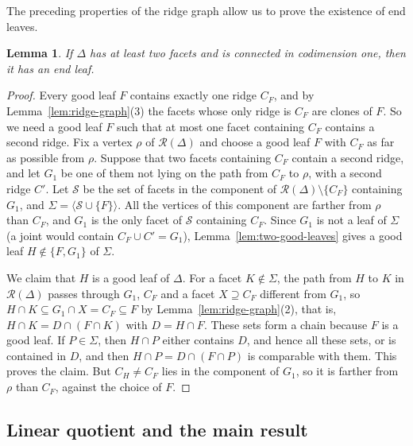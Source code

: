 \documentclass{amsart}
\newtheorem{Lemma}[Theorem]{Lemma}
\theoremstyle{definition}
\theoremstyle{remark}
\begin{document}


The preceding properties of the ridge graph allow us to prove the existence of end leaves.
\begin{Lemma}\label{lem:end-leaf}
If $\Delta$ has at least two facets and is connected in codimension one, then it has an end leaf.
\end{Lemma}
\begin{proof}
Every good leaf $F$ contains exactly one ridge $C_F$, and by Lemma~\ref{lem:ridge-graph}(3) the facets whose only ridge is $C_F$ are clones of $F$. So we need a good leaf $F$ such that at most one facet containing $C_F$ contains a second ridge. Fix a vertex $\rho$ of $\mathcal R(\Delta)$ and choose a good leaf $F$ with $C_F$ as far as possible from $\rho$. Suppose that two facets containing $C_F$ contain a second ridge, and let $G_1$ be one of them not lying on the path from $C_F$ to $\rho$, with a second ridge $C'$. Let $\mathcal S$ be the set of facets in the component of $\mathcal R(\Delta)\setminus\{C_F\}$ containing $G_1$, and $\Sigma=\langle\mathcal S\cup\{F\}\rangle$. All the vertices of this component are farther from $\rho$ than $C_F$, and $G_1$ is the only facet of $\mathcal S$ containing $C_F$. Since $G_1$ is not a leaf of $\Sigma$ (a joint would contain $C_F\cup C'=G_1$), Lemma~\ref{lem:two-good-leaves} gives a good leaf $H\notin\{F,G_1\}$ of $\Sigma$.

We claim that $H$ is a good leaf of $\Delta$. For a facet $K\notin\Sigma$, the path from $H$ to $K$ in $\mathcal R(\Delta)$ passes through $G_1$, $C_F$ and a facet $X\supseteq C_F$ different from $G_1$, so $H\cap K\subseteq G_1\cap X=C_F\subseteq F$ by Lemma~\ref{lem:ridge-graph}(2), that is, $H\cap K=D\cap(F\cap K)$ with $D=H\cap F$. These sets form a chain because $F$ is a good leaf. If $P\in\Sigma$, then $H\cap P$ either contains $D$, and hence all these sets, or is contained in $D$, and then $H\cap P=D\cap(F\cap P)$ is comparable with them. This proves the claim. But $C_H\neq C_F$ lies in the component of $G_1$, so it is farther from $\rho$ than $C_F$, against the choice of $F$.
\end{proof}



\subsection{Linear quotient and the main result}\label{subsec:lq-construction}
\end{document}
